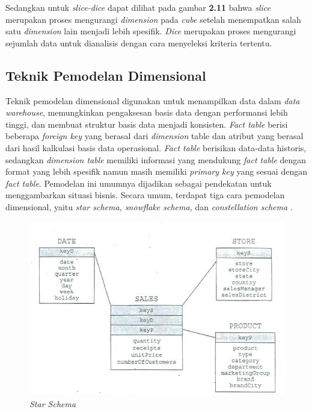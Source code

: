 Sedangkan untuk \textit{slice-dice} dapat dilihat pada gambar \textbf{2.11} bahwa \textit{slice} merupakan proses mengurangi \textit{dimension} pada \textit{cube} setelah menempatkan salah satu \textit{dimension} lain menjadi lebih spesifik. \textit{Dice} merupakan proses mengurangi sejumlah data untuk dianalisis dengan cara menyeleksi kriteria tertentu.

\subsection{Teknik Pemodelan Dimensional}
Teknik pemodelan dimensional digunakan untuk menampilkan data dalam \textit{data warehouse}, memungkinkan pengaksesan basis data dengan performansi lebih tinggi, dan membuat struktur basis data menjadi konsisten. \textit{Fact table} berisi beberapa \textit{foreign key} yang berasal dari \textit{dimension} table dan atribut yang berasal dari hasil kalkulasi basis data operasional. \textit{Fact table} berisikan data-data historis, sedangkan \textit{dimension table} memiliki informasi yang mendukung \textit{fact table} dengan format yang lebih spesifik namun masih memiliki \textit{primary key} yang sesuai dengan \textit{fact table}. Pemodelan ini umumnya dijadikan sebagai pendekatan untuk menggambarkan situasi bisnis. Secara umum, terdapat tiga cara pemodelan dimensional, yaitu \textit{star schema, snowflake schema, }dan \textit{constellation schema} \cite{Matteo:2009}.
	\begin{figure}[h]
	\centering
	\includegraphics[scale=0.65]{Gambar/star-schema}
	\caption{\textit{Star Schema}\cite{Matteo:2009}}
	\end{figure} 
